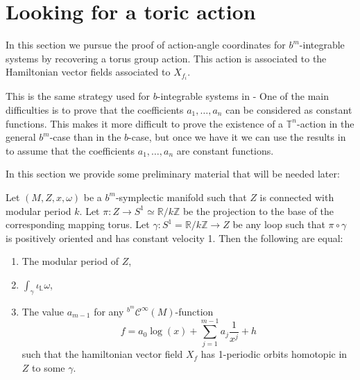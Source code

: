 \section{Looking for a toric action}

In this section we pursue the proof of action-angle coordinates for $b^m$-integrable systems by recovering a torus group action. This action is associated to the Hamiltonian vector fields associated to $X_{f_i}$.

This is the same strategy used for $b$-integrable systems in \cite{KMS16}- One of the main difficulties is  to prove that the coefficients $a_1,\ldots, a_n$ can be considered  as constant functions. This makes it more difficult to prove the existence of a $\mathbb{T}^n$-action in the general $b^m$-case than in the $b$-case, but once we have it we can use the results in \cite{GMW17} to assume that the coefficients $a_1,\ldots, a_n$ are constant functions.






In this section we provide some preliminary material that will be needed later:
\begin{proposition}\label{prop:mod_period}
Let $(M,Z,x,\omega)$ be a $b^m$-symplectic manifold such that $Z$ is connected with modular period $k$.
Let $\pi:Z\rightarrow S^1 \simeq \mathbb{R}/k\mathbb{Z}$ be the projection to the base of the corresponding mapping torus.
Let $\gamma: S^1 = \mathbb{R}/k\mathbb{Z} \rightarrow Z$ be any loop such that $\pi\circ\gamma$ is positively oriented and has constant velocity 1. Then the following are equal:
\begin{enumerate}%
\item The modular period of $Z$,

\item $\int_\gamma \iota_{\mathbb{L}} \omega$,

\item The value $a_{m-1}$ for any $^{b^m}\mathcal{C}^\infty(M)$-function
$$f = a_0 \log(x) + \sum_{j= 1}^{m-1} a_j\frac{1}{x^j} + h$$
such that the hamiltonian vector field $X_f$ has 1-periodic orbits homotopic in $Z$ to some $\gamma$.
\end{enumerate}
\end{proposition}

